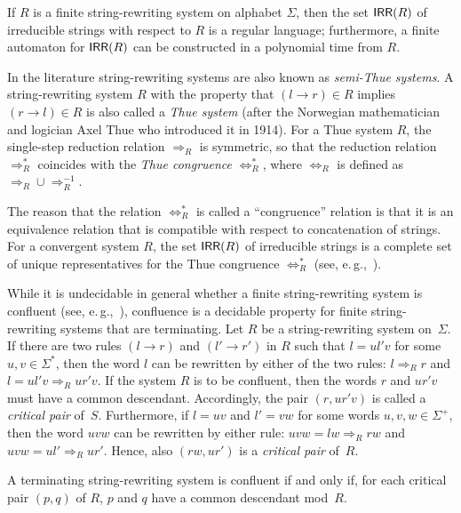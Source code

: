 \begin{lemma}
If $R$ is a finite string-rewriting system on alphabet $\Sigma$, then the set $\textup{\sf IRR}(R)$ of irreducible strings with respect to $R$ is a regular language; furthermore, a finite automaton for $\textup{\sf IRR}(R)$ can be constructed in a polynomial time from $R$.
\end{lemma}

In the literature string-rewriting systems are also known as \emph{semi-Thue systems}. A string-rewriting system $R$ with the property that $(l \to r) \in R$ implies $(r \to l) \in R$ is also called a \emph{Thue system} (after the Norwegian mathematician and logician Axel Thue who introduced it in 1914). For a Thue system $R$, the single-step reduction relation $\Rightarrow_R$ is symmetric, so that the reduction relation $\Rightarrow^*_R$ coincides with the \emph{Thue congruence} $\Leftrightarrow^*_R$, where $\Leftrightarrow_R$ is defined as $\Rightarrow_R \cup \Rightarrow_R^{-1}$.

The reason that the relation $\Leftrightarrow^*_R$ is called a ``congruence'' relation is that it is an equivalence relation that is compatible with respect to concatenation of strings. For a convergent system $R$, the set $\textup{\sf IRR}(R)$ of irreducible strings is a complete set of unique representatives for the Thue congruence $\Leftrightarrow^*_R$ (see, e.\,g.,~\cite{bookOtto93}).

While it is undecidable in general whether a finite string-rewriting system is confluent (see, e.\,g.,~\cite{bookOtto93}), confluence is a decidable property for finite string-rewriting systems that are terminating. Let $R$ be a string-rewriting system on~$\Sigma$. If there are two rules $(l \to r)$ and $(l' \to r')$ in $R$ such that $l = ul'v$ for some $u,v\in\Sigma^*$, then the word $l$ can be rewritten by either of the two rules: $l \Rightarrow_R r$ and $l =ul'v\Rightarrow_R ur'v$. If the system $R$ is to be confluent, then the words $r$ and $ur'v$ must have a common descendant. Accordingly, the pair $(r,ur'v)$ is called a \emph{critical pair} of~$S$. Furthermore, if $l = uv$ and $l'=vw$ for some words $u,v,w\in\Sigma^+$, then the word $uvw$ can be rewritten by either rule: $uvw= l w\Rightarrow_R rw$ and $uvw =ul'\Rightarrow_R ur'$. Hence, also $(rw,ur')$ is  a \emph{critical pair} of~$R$.

\begin{proposition}\label{PropCon}{\rm \cite{KnBe70}}
A terminating string-rewriting system is confluent if and only if, for each critical pair $(p,q)$ of $R$, $p$ and $q$ have a common descendant mod~$R$. 
\end{proposition}

